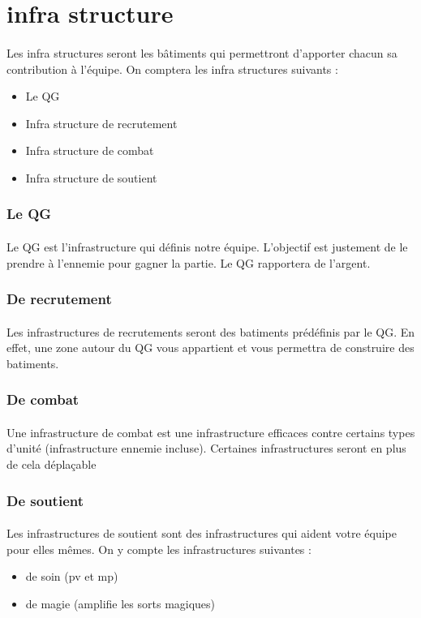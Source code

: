 \newpage

\section{infra structure}

\paragraph{} Les infra structures seront les bâtiments qui permettront d'apporter chacun sa contribution à l'équipe. On comptera les infra structures suivants :
\begin{itemize}
	\item Le QG
	\item Infra structure de recrutement
	\item Infra structure de combat
	\item Infra structure de soutient
\end{itemize}

\subsubsection{Le QG}
\paragraph{} Le QG est l'infrastructure qui définis notre équipe. L'objectif est justement de le prendre à l'ennemie pour gagner la partie. Le QG rapportera de l'argent.

\subsubsection{De recrutement}
\paragraph{} Les infrastructures de recrutements seront des batiments prédéfinis par le QG. En effet, une zone autour du QG vous appartient et vous permettra de construire des batiments.

\subsubsection{De combat}
\paragraph{} Une infrastructure de combat est une infrastructure efficaces contre certains types d'unité (infrastructure ennemie incluse). Certaines infrastructures seront en plus de cela déplaçable

\subsubsection{De soutient}
\paragraph{} Les infrastructures de soutient sont des infrastructures qui aident votre équipe pour elles mêmes. On y compte les infrastructures suivantes :
\begin{itemize}
	\item de soin (pv et mp)
	\item de magie (amplifie les sorts magiques)
\end{itemize}
